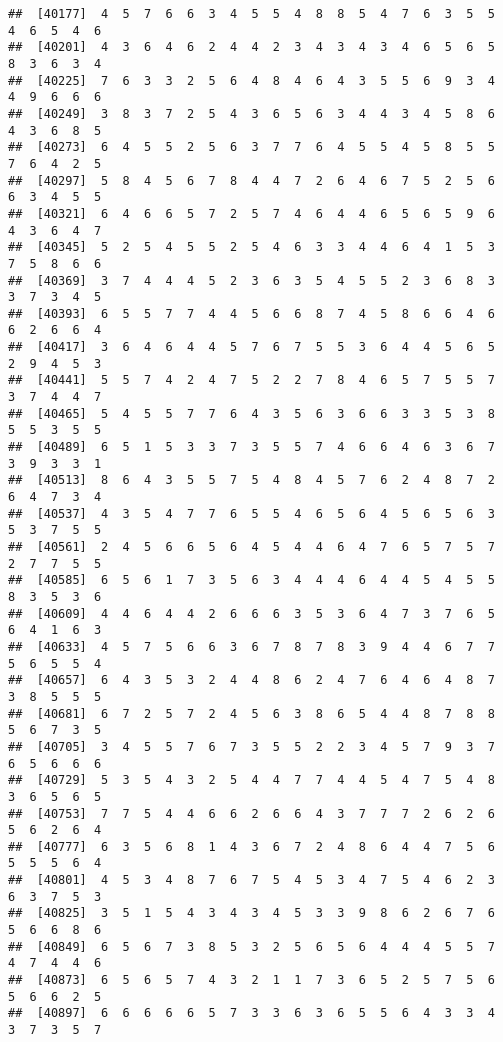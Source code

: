 \documentclass[
]{book}
\begin{document}
\begin{verbatim}
##  [40177]  4  5  7  6  6  3  4  5  5  4  8  8  5  4  7  6  3  5  5  4  6  5  4  6
##  [40201]  4  3  6  4  6  2  4  4  2  3  4  3  4  3  4  6  5  6  5  8  3  6  3  4
##  [40225]  7  6  3  3  2  5  6  4  8  4  6  4  3  5  5  6  9  3  4  4  9  6  6  6
##  [40249]  3  8  3  7  2  5  4  3  6  5  6  3  4  4  3  4  5  8  6  4  3  6  8  5
##  [40273]  6  4  5  5  2  5  6  3  7  7  6  4  5  5  4  5  8  5  5  7  6  4  2  5
##  [40297]  5  8  4  5  6  7  8  4  4  7  2  6  4  6  7  5  2  5  6  6  3  4  5  5
##  [40321]  6  4  6  6  5  7  2  5  7  4  6  4  4  6  5  6  5  9  6  4  3  6  4  7
##  [40345]  5  2  5  4  5  5  2  5  4  6  3  3  4  4  6  4  1  5  3  7  5  8  6  6
##  [40369]  3  7  4  4  4  5  2  3  6  3  5  4  5  5  2  3  6  8  3  3  7  3  4  5
##  [40393]  6  5  5  7  7  4  4  5  6  6  8  7  4  5  8  6  6  4  6  6  2  6  6  4
##  [40417]  3  6  4  6  4  4  5  7  6  7  5  5  3  6  4  4  5  6  5  2  9  4  5  3
##  [40441]  5  5  7  4  2  4  7  5  2  2  7  8  4  6  5  7  5  5  7  3  7  4  4  7
##  [40465]  5  4  5  5  7  7  6  4  3  5  6  3  6  6  3  3  5  3  8  5  5  3  5  5
##  [40489]  6  5  1  5  3  3  7  3  5  5  7  4  6  6  4  6  3  6  7  3  9  3  3  1
##  [40513]  8  6  4  3  5  5  7  5  4  8  4  5  7  6  2  4  8  7  2  6  4  7  3  4
##  [40537]  4  3  5  4  7  7  6  5  5  4  6  5  6  4  5  6  5  6  3  5  3  7  5  5
##  [40561]  2  4  5  6  6  5  6  4  5  4  4  6  4  7  6  5  7  5  7  2  7  7  5  5
##  [40585]  6  5  6  1  7  3  5  6  3  4  4  4  6  4  4  5  4  5  5  8  3  5  3  6
##  [40609]  4  4  6  4  4  2  6  6  6  3  5  3  6  4  7  3  7  6  5  6  4  1  6  3
##  [40633]  4  5  7  5  6  6  3  6  7  8  7  8  3  9  4  4  6  7  7  5  6  5  5  4
##  [40657]  6  4  3  5  3  2  4  4  8  6  2  4  7  6  4  6  4  8  7  3  8  5  5  5
##  [40681]  6  7  2  5  7  2  4  5  6  3  8  6  5  4  4  8  7  8  8  5  6  7  3  5
##  [40705]  3  4  5  5  7  6  7  3  5  5  2  2  3  4  5  7  9  3  7  6  5  6  6  6
##  [40729]  5  3  5  4  3  2  5  4  4  7  7  4  4  5  4  7  5  4  8  3  6  5  6  5
##  [40753]  7  7  5  4  4  6  6  2  6  6  4  3  7  7  7  2  6  2  6  5  6  2  6  4
##  [40777]  6  3  5  6  8  1  4  3  6  7  2  4  8  6  4  4  7  5  6  5  5  5  6  4
##  [40801]  4  5  3  4  8  7  6  7  5  4  5  3  4  7  5  4  6  2  3  6  3  7  5  3
##  [40825]  3  5  1  5  4  3  4  3  4  5  3  3  9  8  6  2  6  7  6  5  6  6  8  6
##  [40849]  6  5  6  7  3  8  5  3  2  5  6  5  6  4  4  4  5  5  7  4  7  4  4  6
##  [40873]  6  5  6  5  7  4  3  2  1  1  7  3  6  5  2  5  7  5  6  5  6  6  2  5
##  [40897]  6  6  6  6  6  5  7  3  3  6  3  6  5  5  6  4  3  3  4  3  7  3  5  7

\end{verbatim}
\end{document}
